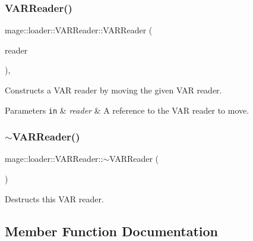 \subsubsection{\texorpdfstring{V\+A\+R\+Reader()}{VARReader()}\hspace{0.1cm}{\footnotesize\ttfamily [3/3]}}
{\footnotesize\ttfamily mage\+::loader\+::\+V\+A\+R\+Reader\+::\+V\+A\+R\+Reader (\begin{DoxyParamCaption}\item[{\mbox{\hyperlink{classmage_1_1loader_1_1_v_a_r_reader}{V\+A\+R\+Reader}} \&\&}]{reader }\end{DoxyParamCaption})\hspace{0.3cm}{\ttfamily [default]}, {\ttfamily [noexcept]}}

Constructs a V\+AR reader by moving the given V\+AR reader.


\begin{DoxyParams}[1]{Parameters}
\mbox{\tt in}  & {\em reader} & A reference to the V\+AR reader to move. \\
\hline
\end{DoxyParams}
\mbox{\label{classmage_1_1loader_1_1_v_a_r_reader_acd3bbd51ccc774d2f74a4520b6143990}} 
\subsubsection{\texorpdfstring{$\sim$\+V\+A\+R\+Reader()}{~VARReader()}}
{\footnotesize\ttfamily mage\+::loader\+::\+V\+A\+R\+Reader\+::$\sim$\+V\+A\+R\+Reader (\begin{DoxyParamCaption}{ }\end{DoxyParamCaption})\hspace{0.3cm}{\ttfamily [default]}}

Destructs this V\+AR reader. 

\subsection{Member Function Documentation}
\mbox{\label{classmage_1_1loader_1_1_v_a_r_reader_a78d39071ad5103c848782ff82be397bb}} 
